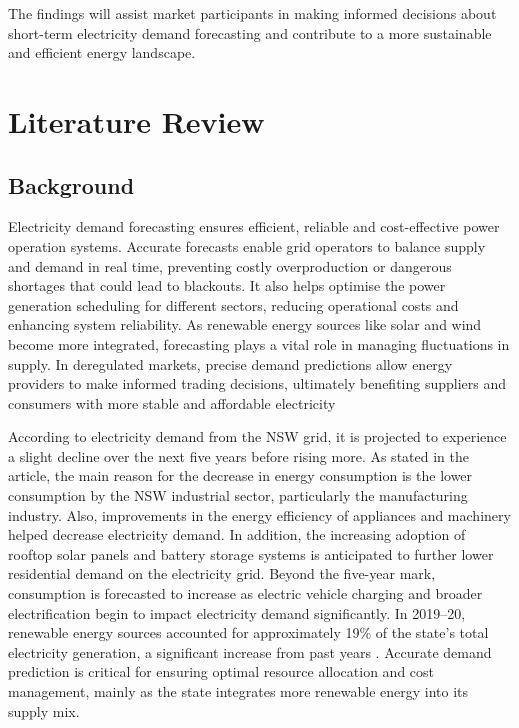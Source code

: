 \documentclass[mstat,12pt]{unswthesis}
\begin{document}
The findings will assist market participants in making informed
decisions about short-term electricity demand forecasting and contribute
to a more sustainable and efficient energy landscape.

\bigskip

\chapter{Literature Review}\label{literature-review}

\section{Background}\label{background}

Electricity demand forecasting ensures efficient, reliable and
cost-effective power operation systems. Accurate forecasts enable grid
operators to balance supply and demand in real time, preventing costly
overproduction or dangerous shortages that could lead to blackouts. It
also helps optimise the power generation scheduling for different
sectors, reducing operational costs and enhancing system reliability. As
renewable energy sources like solar and wind become more integrated,
forecasting plays a vital role in managing fluctuations in supply. In
deregulated markets, precise demand predictions allow energy providers
to make informed trading decisions, ultimately benefiting suppliers and
consumers with more stable and affordable electricity

According to \cite{nsw_epa_2021_energy_consumption} electricity demand
from the NSW grid, it is projected to experience a slight decline over
the next five years before rising more. As stated in the article, the
main reason for the decrease in energy consumption is the lower
consumption by the NSW industrial sector, particularly the manufacturing
industry. Also, improvements in the energy efficiency of appliances and
machinery helped decrease electricity demand. In addition, the
increasing adoption of rooftop solar panels and battery storage systems
is anticipated to further lower residential demand on the electricity
grid. Beyond the five-year mark, consumption is forecasted to increase
as electric vehicle charging and broader electrification begin to impact
electricity demand significantly. In 2019--20, renewable energy sources
accounted for approximately 19\% of the state's total electricity
generation, a significant increase from past years
\cite{nsw_epa_2021_energy_consumption}. Accurate demand prediction is
critical for ensuring optimal resource allocation and cost management,
mainly as the state integrates more renewable energy into its supply
mix.
\end{document}
